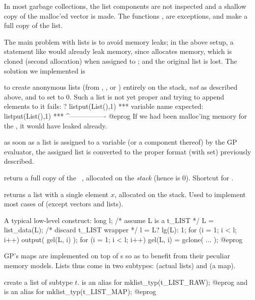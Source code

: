 In most garbage collections, the list components are not inspected
and a shallow copy of the malloc'ed vector is made. The functions
,  are exceptions, and make a full copy of
the list.

The main problem with lists is to avoid memory leaks; in the above setup,
a statement like  would already leak memory, since
 allocates memory, which is cloned (second allocation) when
assigned to ; and the original list is lost. The solution we
implemented is

\item to create anonymous lists (from , ,
 or ) entirely on the stack, \emph{not} as described
above, and to set  to $0$. Such a list is not yet proper and
trying to append elements to it fails:
\bprog
? listput(List(),1)
  ***   variable name expected: listput(List(),1)
  ***                                   ^----------------
@eprog\noindent
If we had been malloc'ing memory for the
, it would have leaked already.

\item as soon as a list is assigned to a variable (or a component thereof)
by the GP evaluator, the assigned list is converted to the proper format
(with  set) previously described.

 return a full copy of the ~,
allocated on the \emph{stack} (hence  is $0$). Shortcut for
.

 returns a list with a single element $x$,
allocated on the stack. Used to implement most cases of 
(except vectors and lists).

A typical low-level construct:
\bprog
  long l;
  /* assume L is a t_LIST */
  L = list_data(L); /* discard t_LIST wrapper */
  l = L? lg(L): 1;
  for (i = 1; i < l; i++) output( gel(L, i) );
  for (i = 1; i < l; i++) gel(L, i) = gclone( ... );
@eprog


GP's maps are implemented on top of s so as to benefit from
their peculiar memory models. Lists thus come in two subtypes: 
(actual lists) and  (a map).

 create a list of subtype $t$.
 is an alias for
\bprog
  mklist_typ(t_LIST_RAW);
@eprog
and
 is an alias for
\bprog
  mklist_typ(t_LIST_MAP);
@eprog

